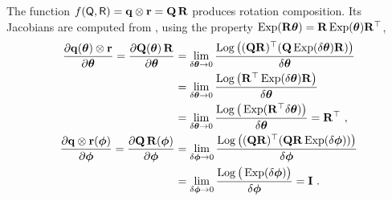 The function $f(\sQ,\sR) = \bfq\ot\bfr = \bfQ\,\bfR$ produces rotation composition. Its Jacobians are computed from , using the property $\Exp(\bfR\bth)=\bfR\Exp(\bth)\bfR\tr$,
%
\begin{align*}
\dpar{\bfq(\bftheta)\ot\bfr}{\bftheta} 
=
\dpar{\bfQ(\bftheta)\,\bfR}{\bftheta} 
&= \lim_{\delta\bftheta\to0}\frac{\Log\big((\bfQ\bfR)\tr(\bfQ\Exp(\delta\bftheta)\bfR)\big)}{\delta\bftheta} \\
&= \lim_{\delta\bftheta\to0}\frac{\Log\big(\bfR\tr\Exp(\delta\bftheta)\bfR\big)}{\delta\bftheta} \\
&= \lim_{\delta\bftheta\to0}\frac{\Log\big(\Exp(\bfR\tr\delta\bftheta)\big)}{\delta\bftheta} 
= \bfR\tr
~,
\\
\dpar{\bfq\ot\bfr(\bfphi)}{\bfphi} 
=
\dpar{\bfQ\,\bfR(\bfphi)}{\bfphi} 
&= \lim_{\delta\bfphi\to0}\frac{\Log\big((\bfQ\bfR)\tr(\bfQ\bfR\Exp(\delta\bfphi))\big)}{\delta\bfphi} \\
&= \lim_{\delta\bfphi\to0}\frac{\Log\big(\Exp(\delta\bfphi)\big)}{\delta\bfphi} 
= \bfI
~.
\end{align*}




